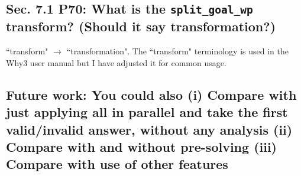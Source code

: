 \documentclass[]{article}
\begin{document}
\subsection{Sec. 7.1 P70: What is the \texttt{split\_goal\_wp} transform? (Should it say transformation?)}

``transform" $\rightarrow$ ``transformation". The ``transform" terminology is used in the \textsf{Why3} user manual but I have adjusted it for common usage. 

\subsection{Future work: You could also (i) Compare with just applying all in parallel and take the first valid/invalid answer,	without any analysis (ii) Compare with and without pre-solving (iii) Compare with use of other features}
\end{document}
